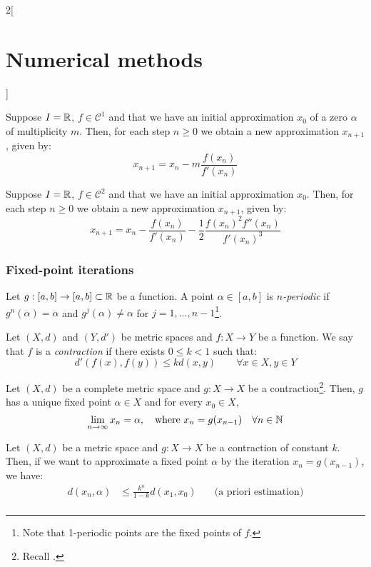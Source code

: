 \documentclass[../../../main_math.tex]{subfiles}
\begin{document}
\begin{multicols}{2}[\section{Numerical methods}]
\begin{proposition}
  \end{proposition}
  \begin{proposition}
    Suppose $I=\mathbb{R}$, $f\in\mathcal{C}^1$ and that we have an initial approximation $x_0$ of a zero $\alpha$ of multiplicity $m$. Then, for each step $n\geq 0$ we obtain a new approximation $x_{n+1}$, given by: $$x_{n+1}=x_n-m\frac{f(x_n)}{f'(x_n)}$$
  \end{proposition}
  \begin{proposition}
    Suppose $I=\mathbb{R}$, $f\in\mathcal{C}^2$ and that we have an initial approximation $x_0$. Then, for each step $n\geq 0$ we obtain a new approximation $x_{n+1}$, given by: $$x_{n+1}=x_n-\frac{f(x_n)}{f'(x_n)}-\frac{1}{2}\frac{{f(x_n)}^2f''(x_n)}{{f'(x_n)}^3}$$
  \end{proposition}
  \subsubsection{Fixed-point iterations}
  \begin{definition}
    Let $g:[a,b]\rightarrow[a,b]\subset\mathbb{R}$ be a function. A point $\alpha\in[a,b]$ is \emph{$n$-periodic} if $g^n(\alpha)=\alpha$ and $g^j(\alpha)\ne\alpha$ for $j=1,\ldots,n-1$\footnote{Note that 1-periodic points are the fixed points of $f$.}.
  \end{definition}
  \begin{definition}
    Let $(X,d)$ and $(Y,d')$  be metric spaces and $f:X\rightarrow Y$ be a function. We say that $f$ is a \emph{contraction} if there exists $0\leq k<1$ such that: $$d'(f(x),f(y))\leq kd(x,y)\qquad\forall x\in X,y\in Y$$
  \end{definition}
  \begin{theorem}
    Let $(X,d)$ be a complete metric space and $g:X\rightarrow X$ be a contraction\footnote{Recall .}. Then, $g$ has a unique fixed point $\alpha\in X$ and for every $x_0\in X$, $$\lim_{n\to\infty}x_n=\alpha,\quad\text{where }x_n=g(x_{n-1})\quad\forall n\in\mathbb{N}$$
  \end{theorem}
  \begin{proposition}
    Let $(X,d)$ be a metric space and $g:X\rightarrow X$ be a contraction of constant $k$. Then, if we want to approximate a fixed point $\alpha$ by the iteration $x_n=g(x_{n-1})$, we have:
    \begin{align*}
      d(x_n,\alpha) & \leq\frac{k^n}{1-k}d(x_1,x_0)\quad   & \text{(a priori estimation)}     \\

\end{align*}
\end{proposition}
\end{multicols}
\end{document}

